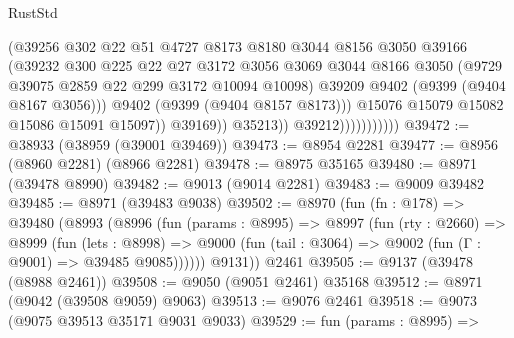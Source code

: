 \begin{lexlean}{RustStd}
\begin{coremodule}
                                      (@39256
                                        @302
                                        @22
                                        @51
                                        @4727
                                        @8173
                                        @8180
                                        @3044
                                        @8156
                                        @3050
                                        @39166
                                        (@39232
                                          @300
                                          @225
                                          @22
                                          @27
                                          @3172
                                          @3056
                                          @3069
                                          @3044
                                          @8166
                                          @3050
                                          (@9729 @39075 @2859 @22 @299 @3172 @10094 @10098)
                                          @39209
                                          @9402
                                          (@9399 (@9404 @8167 @3056)))
                                        @9402
                                        (@9399 (@9404 @8157 @8173)))
                                      @15076
                                      @15079
                                      @15082
                                      @15086
                                      @15091
                                      @15097))
                                  @39169))
                              @35213))
                          @39212)))))))))))
@39472 := @38933 (@38959 (@39001 @39469))
@39473 := @8954 @2281
@39477 := @8956 (@8960 @2281) (@8966 @2281)
@39478 := @8975 @35165
@39480 := @8971 (@39478 @8990)
@39482 := @9013 (@9014 @2281)
@39483 := @9009 @39482
@39485 := @8971 (@39483 @9038)
@39502 := @8970
    (fun (fn : @178) =>
    @39480
      (@8993
        (@8996
          (fun (params : @8995) =>
          @8997
            (fun (rty : @2660) =>
            @8999
              (fun (lets : @8998) =>
              @9000 (fun (tail : @3064) => @9002 (fun (Γ : @9001) => @39485 @9085))))))
        @9131))
    @2461
@39505 := @9137 (@39478 (@8988 @2461))
@39508 := @9050 (@9051 @2461) @35168
@39512 := @8971 (@9042 (@39508 @9059) @9063)
@39513 := @9076 @2461
@39518 := @9073 (@9075 @39513 @35171 @9031 @9033)
@39529 := fun (params : @8995) =>

\end{coremodule}
\end{lexlean}

